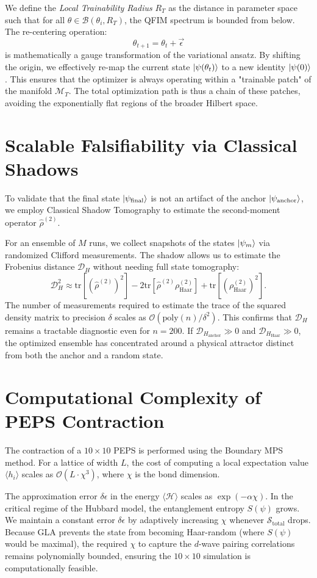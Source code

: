 \documentclass[aps,prx,reprint,superscriptaddress,amsmath,amssymb]{revtex4-2}
\newcommand{\tr}{\mathrm{tr}}
\newcommand{\poly}{\mathrm{poly}}
\newcommand{\McalT}{\mathcal{M}_T}
\newcommand{\DcalH}{\mathcal{D}_H}
\newcommand{\Stotal}{\mathcal{S}_{\text{total}}}
\begin{document}
We define the \textit{Local Trainability Radius} $R_T$ as the distance in parameter space such that for all $\theta \in \mathcal{B}(\theta_i, R_T)$, the QFIM spectrum is bounded from below. The re-centering operation:
\begin{equation}
\theta_{t+1} = \theta_t + \vec{\epsilon}
\end{equation}
is mathematically a gauge transformation of the variational ansatz. By shifting the origin, we effectively re-map the current state $\ket{\psi(\theta_t)}$ to a new identity $\ket{\psi(0)}$. This ensures that the optimizer is always operating within a "trainable patch" of the manifold $\McalT$. The total optimization path is thus a chain of these patches, avoiding the exponentially flat regions of the broader Hilbert space.

\section{Scalable Falsifiability via Classical Shadows} \label{app:shadows}
To validate that the final state $\ket{\psi_{\text{final}}}$ is not an artifact of the anchor $\ket{\psi_{\text{anchor}}}$, we employ Classical Shadow Tomography to estimate the second-moment operator $\hat{\rho}^{(2)}$.

For an ensemble of $M$ runs, we collect snapshots of the states $\ket{\psi_m}$ via randomized Clifford measurements. The shadow allows us to estimate the Frobenius distance $\DcalH$ without needing full state tomography:
\begin{equation}
\DcalH^2 \approx \tr [(\hat{\rho}^{(2)})^2] - 2\tr[\hat{\rho}^{(2)}\rho_{\text{Haar}}^{(2)}] + \tr[(\rho_{\text{Haar}}^{(2)})^2].
\end{equation}
The number of measurements required to estimate the trace of the squared density matrix to precision $\delta$ scales as $\mathcal{O}(\poly(n)/\delta^2)$. This confirms that $\DcalH$ remains a tractable diagnostic even for $n=200$. If $\DcalH_{\text{anchor}} \gg 0$ and $\DcalH_{\text{Haar}} \gg 0$, the optimized ensemble has concentrated around a physical attractor distinct from both the anchor and a random state.

\section{Computational Complexity of PEPS Contraction} \label{app:peps_math}
The contraction of a $10 \times 10$ PEPS is performed using the Boundary MPS method. For a lattice of width $L$, the cost of computing a local expectation value $\langle h_i \rangle$ scales as $\mathcal{O}(L \cdot \chi^3)$, where $\chi$ is the bond dimension.

The approximation error $\delta \epsilon$ in the energy $\langle \mathcal{H} \rangle$ scales as $\exp(-\alpha \chi)$. In the critical regime of the Hubbard model, the entanglement entropy $S(\psi)$ grows. We maintain a constant error $\delta \epsilon$ by adaptively increasing $\chi$ whenever $\Stotal$ drops. Because GLA prevents the state from becoming Haar-random (where $S(\psi)$ would be maximal), the required $\chi$ to capture the $d$-wave pairing correlations remains polynomially bounded, ensuring the $10 \times 10$ simulation is computationally feasible.
\end{document}
